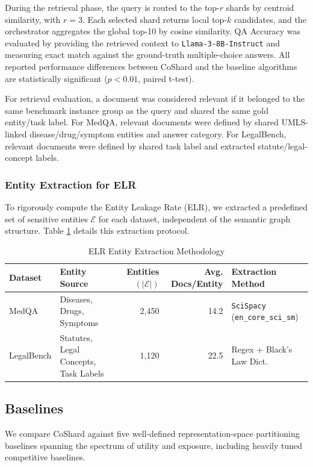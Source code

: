 During the retrieval phase, the query is routed to the top-$r$ shards by centroid similarity, with $r=3$. Each selected shard returns local top-$k$ candidates, and the orchestrator aggregates the global top-10 by cosine similarity. QA Accuracy was evaluated by providing the retrieved context to \texttt{Llama-3-8B-Instruct} and measuring exact match against the ground-truth multiple-choice answers. All reported performance differences between CoShard and the baseline algorithms are statistically significant ($p < 0.01$, paired t-test).

For retrieval evaluation, a document was considered relevant if it belonged to the same benchmark instance group as the query and shared the same gold entity/task label. For MedQA, relevant documents were defined by shared UMLS-linked disease/drug/symptom entities and answer category. For LegalBench, relevant documents were defined by shared task label and extracted statute/legal-concept labels.

\subsubsection{Entity Extraction for ELR}
To rigorously compute the Entity Leakage Rate (ELR), we extracted a predefined set of sensitive entities $\mathcal{E}$ for each dataset, independent of the semantic graph structure. Table \ref{tab:elr_extraction} details this extraction protocol.

\begin{table}[htbp]
\centering
\caption{ELR Entity Extraction Methodology}
\label{tab:elr_extraction}
\begin{tabular}{llrrl}
\hline
\textbf{Dataset} & \textbf{Entity Source} & \textbf{Entities} $(|\mathcal{E}|)$ & 
\textbf{Avg. Docs/Entity} & \textbf{Extraction Method} \\
\hline
MedQA & Diseases, Drugs, Symptoms & 2{,}450 & 14.2 & \texttt{SciSpacy} (\texttt{en\_core\_sci\_sm}) \\
LegalBench & Statutes, Legal Concepts, Task Labels & 1{,}120 & 22.5 & Regex + Black's Law Dict. \\
\hline
\end{tabular}%
\end{table}

\subsection{Baselines}
We compare CoShard against five well-defined representation-space partitioning baselines spanning the spectrum of utility and exposure, including heavily tuned competitive baselines.

